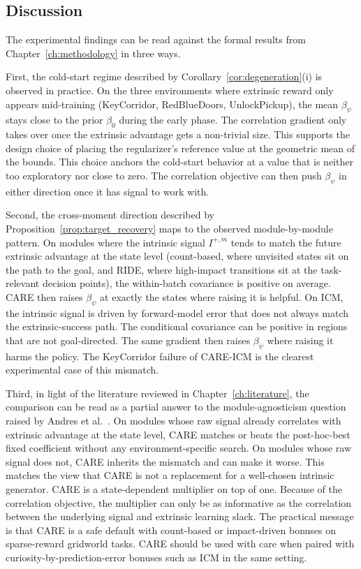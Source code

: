 \subsection{Discussion}
\label{sec:results_discussion}

The experimental findings can be read against the formal results from Chapter~\ref{ch:methodology} in three ways.

First, the cold-start regime described by Corollary~\ref{cor:degeneration}(i) is observed in practice. On the three environments where extrinsic reward only appears mid-training (KeyCorridor, RedBlueDoors, UnlockPickup), the mean $\beta_\psi$ stays close to the prior $\beta_0$ during the early phase. The correlation gradient only takes over once the extrinsic advantage gets a non-trivial size. This supports the design choice of placing the regularizer's reference value at the geometric mean of the bounds. This choice anchors the cold-start behavior at a value that is neither too exploratory nor close to zero. The correlation objective can then push $\beta_\psi$ in either direction once it has signal to work with.

Second, the cross-moment direction described by Proposition~\ref{prop:target_recovery} maps to the observed module-by-module pattern. On modules where the intrinsic signal $I^{+,m}$ tends to match the future extrinsic advantage at the state level (count-based, where unvisited states sit on the path to the goal, and RIDE, where high-impact transitions sit at the task-relevant decision points), the within-batch covariance is positive on average. CARE then raises $\beta_\psi$ at exactly the states where raising it is helpful. On ICM, the intrinsic signal is driven by forward-model error that does not always match the extrinsic-success path. The conditional covariance can be positive in regions that are not goal-directed. The same gradient then raises $\beta_\psi$ where raising it harms the policy. The KeyCorridor failure of CARE-ICM is the clearest experimental case of this mismatch.

Third, in light of the literature reviewed in Chapter~\ref{ch:literature}, the comparison can be read as a partial answer to the module-agnosticism question raised by Andres et al.\ \cite{andres2025impact}. On modules whose raw signal already correlates with extrinsic advantage at the state level, CARE matches or beats the post-hoc-best fixed coefficient without any environment-specific search. On modules whose raw signal does not, CARE inherits the mismatch and can make it worse. This matches the view that CARE is not a replacement for a well-chosen intrinsic generator. CARE is a state-dependent multiplier on top of one. Because of the correlation objective, the multiplier can only be as informative as the correlation between the underlying signal and extrinsic learning slack. The practical message is that CARE is a safe default with count-based or impact-driven bonuses on sparse-reward gridworld tasks. CARE should be used with care when paired with curiosity-by-prediction-error bonuses such as ICM in the same setting.

